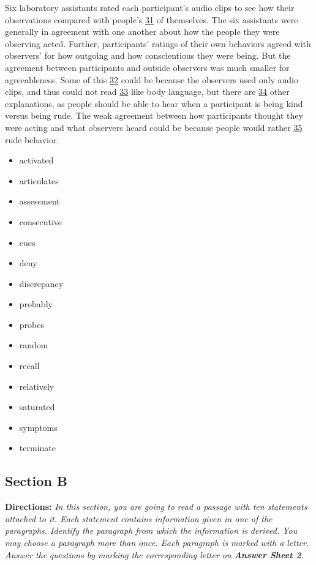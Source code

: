 \documentclass[UTF8,11pt]{ctexart}
\begin{document}
Six laboratory assistants rated each participant’s audio clips to see how their observations compared with people’s \uline{31} of themselves. The six assistants were generally in agreement with one another about how the people they were observing acted. Further, participants’ ratings of their own behaviors agreed with observers’ for how outgoing and how conscientious they were being. But the agreement between participants and outside observers was much smaller for agreeableness. Some of this \uline{32} could be because the observers used only audio clips, and thus could not read \uline{33} like body language, but there are \uline{34} other explanations, as people should be able to hear when a participant is being kind versus being rude. The weak agreement between how participants thought they were acting and what observers heard could be because people would rather \uline{35} rude behavior.


\begin{itemize}[leftmargin=2em,itemsep=.2em,topsep=.4em]\item[A.] activated
\item[B.] articulates
\item[C.] assessment
\item[D.] consecutive
\item[E.] cues
\item[F.] deny
\item[G.] discrepancy
\item[H.] probably
\item[I.] probes
\item[J.] random
\item[K.] recall
\item[L.] relatively
\item[M.] saturated
\item[N.] symptoms
\item[O.] terminate
\end{itemize}

\subsection*{\textbf{Section B}}


\textbf{Directions:} \textit{In this section, you are going to read a passage with ten statements attached to it. Each statement} \textit{contains information given in one of the paragraphs. Identify the paragraph from which the information is} \textit{derived. You may choose a paragraph more than once. Each paragraph is marked with a letter. Answer the} \textit{questions by marking the corresponding letter on }\textbf{\textit{Answer Sheet 2}}\textit{.}
\end{document}
